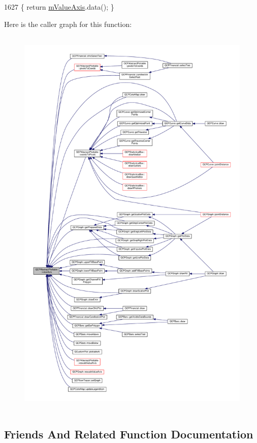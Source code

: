 \begin{DoxyCode}
1627 \{ \textcolor{keywordflow}{return} \hyperlink{class_q_c_p_abstract_plottable_a2901452ca4aea911a1827717934a4bda}{mValueAxis}.data(); \}
\end{DoxyCode}


Here is the caller graph for this function\+:\nopagebreak
\begin{figure}[H]
\begin{center}
\leavevmode
\includegraphics[height=550pt]{class_q_c_p_abstract_plottable_a3106f9d34d330a6097a8ec5905e5b519_icgraph}
\end{center}
\end{figure}




\subsection{Friends And Related Function Documentation}
\hypertarget{class_q_c_p_abstract_plottable_af123edeca169ec7a31958a1d714e1a8a}{}
